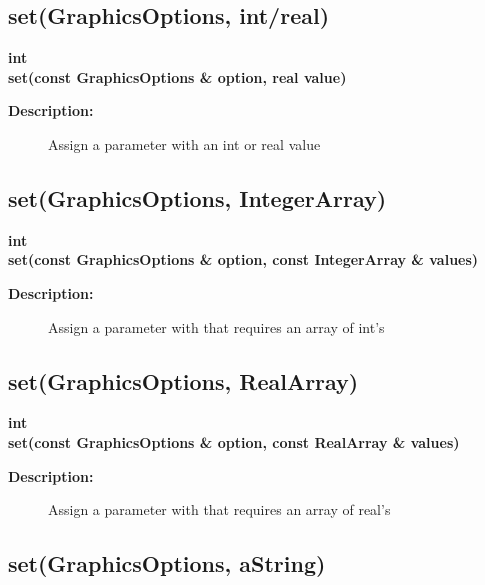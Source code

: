 \subsection{set(GraphicsOptions, int/real)}
 
\begin{flushleft} \textbf{%
int   \\ 
\settowidth{\GraphicsParametersIncludeArgIndent}{set(}%
set(const GraphicsOptions \& option, real value)
}\end{flushleft}
\begin{description}
\item[{\bf Description:}] 
   Assign a parameter with an int or real value

\end{description}
\subsection{set(GraphicsOptions, IntegerArray)}
 
\begin{flushleft} \textbf{%
int  \\ 
\settowidth{\GraphicsParametersIncludeArgIndent}{set(}%
set(const GraphicsOptions \& option, const IntegerArray \& values)
}\end{flushleft}
\begin{description}
\item[{\bf Description:}] 
   Assign a parameter with that requires an array of int's

\end{description}
\subsection{set(GraphicsOptions, RealArray)}
 
\begin{flushleft} \textbf{%
int  \\ 
\settowidth{\GraphicsParametersIncludeArgIndent}{set(}%
set(const GraphicsOptions \& option, const RealArray \& values)
}\end{flushleft}
\begin{description}
\item[{\bf Description:}] 
   Assign a parameter with that requires an array of real's

\end{description}
\subsection{set(GraphicsOptions, aString)}
 
